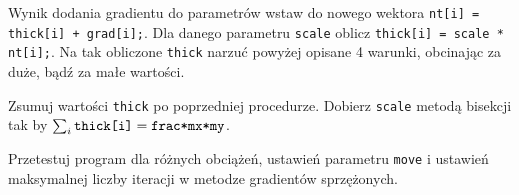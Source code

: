 \documentclass{instrukcja}
\begin{document}
\begin{zad}
Wynik dodania gradientu do parametrów wstaw do nowego wektora {\tt nt[i] = thick[i] + grad[i];}. Dla danego parametru {\tt scale} oblicz {\tt thick[i] = scale * nt[i];}. Na tak obliczone {\tt thick} narzuć powyżej opisane 4 warunki, obcinając za duże, bądź za małe wartości.
\end{zad}

\begin{zad}
Zsumuj wartości {\tt thick} po poprzedniej procedurze. Dobierz {\tt scale} metodą bisekcji tak by $\sum_i\text{\tt thick[i]} = \text{\tt frac*mx*my}$.
\end{zad}

\begin{zad}
Przetestuj program dla różnych obciążeń, ustawień parametru {\tt move} i ustawień maksymalnej liczby iteracji w metodze gradientów sprzężonych.
\end{zad}
\end{document}

